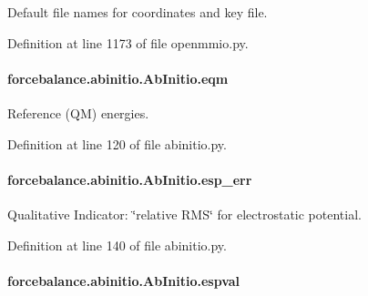 Default file names for coordinates and key file. 



Definition at line 1173 of file openmmio.\-py.

\hypertarget{classforcebalance_1_1abinitio_1_1AbInitio_a64387fae9bdfb0d03ca6961e67c779be}{
\paragraph[{eqm}]{\setlength{\rightskip}{0pt plus 5cm}forcebalance.\-abinitio.\-Ab\-Initio.\-eqm\hspace{0.3cm}{\ttfamily [inherited]}}}\label{classforcebalance_1_1abinitio_1_1AbInitio_a64387fae9bdfb0d03ca6961e67c779be}


Reference (Q\-M) energies. 



Definition at line 120 of file abinitio.\-py.

\hypertarget{classforcebalance_1_1abinitio_1_1AbInitio_abdc625c3149cee375b56b4e0d73034fe}{
\paragraph[{esp\-\_\-err}]{\setlength{\rightskip}{0pt plus 5cm}forcebalance.\-abinitio.\-Ab\-Initio.\-esp\-\_\-err\hspace{0.3cm}{\ttfamily [inherited]}}}\label{classforcebalance_1_1abinitio_1_1AbInitio_abdc625c3149cee375b56b4e0d73034fe}


Qualitative Indicator\-: \char`\"{}relative R\-M\-S\char`\"{} for electrostatic potential. 



Definition at line 140 of file abinitio.\-py.

\hypertarget{classforcebalance_1_1abinitio_1_1AbInitio_aba6d885086d455fce8c3d472fd08020d}{
\paragraph[{espval}]{\setlength{\rightskip}{0pt plus 5cm}forcebalance.\-abinitio.\-Ab\-Initio.\-espval\hspace{0.3cm}{\ttfamily [inherited]}}}\label{classforcebalance_1_1abinitio_1_1AbInitio_aba6d885086d455fce8c3d472fd08020d}



